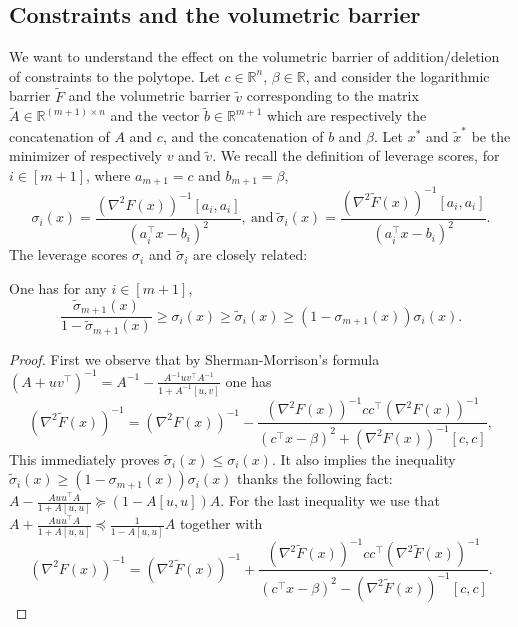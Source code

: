 \documentclass[openany]{now}
\renewcommand{\tilde}{\widetilde}
\begin{document}
\subsection{Constraints and the volumetric barrier} \label{sec:constraintsvolumetric}
We want to understand the effect on the volumetric barrier of addition/deletion of constraints to the polytope. Let $c \in \mathbb{R}^n$, $\beta \in \mathbb{R}$, and consider the logarithmic barrier $\tilde{F}$ and the volumetric barrier $\tilde{v}$ corresponding to the matrix $\tilde{A}\in \mathbb{R}^{(m+1) \times n}$ and the vector $\tilde{b} \in \mathbb{R}^{m+1}$ which are respectively the concatenation of $A$ and $c$, and the concatenation of $b$ and $\beta$. Let $x^*$ and $\tilde{x}^*$ be the minimizer of respectively $v$ and $\tilde{v}$. We recall the definition of leverage scores, for $i \in [m+1]$, where $a_{m+1}=c$ and $b_{m+1}=\beta$,
$$\sigma_i(x) = \frac{(\nabla^2 F(x) )^{-1}[a_i, a_i]}{(a_i^{\top} x - b_i)^2}, \ \text{and} \ \tilde{\sigma}_i(x) = \frac{(\nabla^2 \tilde{F}(x) )^{-1}[a_i, a_i]}{(a_i^{\top} x - b_i)^2}.$$
The leverage scores $\sigma_i$ and $\tilde{\sigma}_i$ are closely related:
\begin{lemma} \label{lem:V1}
One has for any $i \in [m+1]$,
$$\frac{\tilde{\sigma}_{m+1}(x)}{1 - \tilde{\sigma}_{m+1}(x)} \geq \sigma_i(x) \geq \tilde{\sigma}_i(x) \geq (1-\sigma_{m+1}(x)) \sigma_i(x) .$$
\end{lemma}

\begin{proof}
First we observe that by Sherman-Morrison's formula $(A+uv^{\top})^{-1} = A^{-1} - \frac{A^{-1} u v^{\top} A^{-1}}{1+A^{-1}[u,v]}$ one has
\begin{equation} \label{eq:SM}
(\nabla^2 \tilde{F}(x))^{-1} = (\nabla^2 F(x))^{-1} - \frac{(\nabla^2 F(x))^{-1} c c^{\top} (\nabla^2 F(x))^{-1}}{(c^{\top} x - \beta)^2 + (\nabla^2 F(x))^{-1}[c,c]} ,
\end{equation}
This immediately proves $\tilde{\sigma}_i(x) \leq \sigma_i(x)$. It also implies the inequality $\tilde{\sigma}_i(x) \geq (1-\sigma_{m+1}(x)) \sigma_i(x)$ thanks the following fact: $A - \frac{A u u^{\top} A}{1+A[u,u]} \succeq (1-A[u,u]) A$. For the last inequality we use that $A + \frac{A u u^{\top} A}{1+A[u,u]} \preceq \frac{1}{1-A[u,u]} A$ together with
$$(\nabla^2 {F}(x))^{-1} = (\nabla^2 \tilde{F}(x))^{-1} + \frac{(\nabla^2 \tilde{F}(x))^{-1} c c^{\top} (\nabla^2 \tilde{F}(x))^{-1}}{(c^{\top} x - \beta)^2 - (\nabla^2 \tilde{F}(x))^{-1}[c,c]} .$$
\end{proof}
\end{document}
